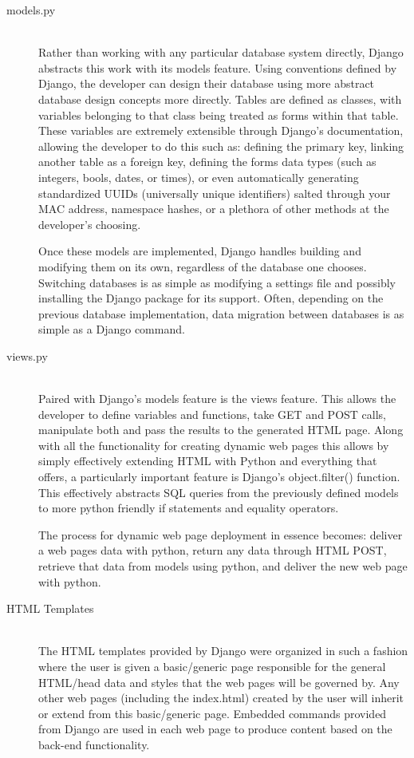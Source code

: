 \documentclass[sigconf]{acmart}
\begin{document}
\hspace{1em}\begin{description}
	\item[models.py] \hfill \\
	Rather than working with any particular database system directly, Django abstracts this work with its models feature. Using conventions defined by Django, the developer can design their database using more abstract database design concepts more directly. Tables are defined as classes, with variables belonging to that class being treated as forms within that table. These variables are extremely extensible through Django's documentation, allowing the developer to do this such as: defining the primary key, linking another table as a foreign key, defining the forms data types (such as integers, bools, dates, or times), or even automatically generating standardized UUIDs (universally unique identifiers) salted through your MAC address, namespace hashes, or a plethora of other methods at the developer's choosing. \par
	Once these models are implemented, Django handles building and modifying them on its own, regardless of the database one chooses. Switching databases is as simple as modifying a settings file and possibly installing the Django package for its support. Often, depending on the previous database implementation, data migration between databases is as simple as a Django command.
	\item[views.py] \hfill \\
	Paired with Django's models feature is the views feature. This allows the developer to define variables and functions, take GET and POST calls, manipulate both and pass the results to the generated HTML page. Along with all the functionality for creating dynamic web pages this allows by simply effectively extending HTML with Python and everything that offers, a particularly important feature is Django's object.filter() function. This effectively abstracts SQL queries from the previously defined models to more python friendly if statements and equality operators. \par
	The process for dynamic web page deployment in essence becomes: deliver a web pages data with python, return any data through HTML POST, retrieve that data from models using python, and deliver the new web page with python.
	\item[HTML Templates] \hfill \\
	The HTML templates provided by Django were organized in such a fashion where the user is given a basic/generic
	page responsible for the general HTML/head data and styles that the web pages will be governed by. Any other web pages (including the index.html) created by the user will inherit or extend from this basic/generic page. Embedded commands provided from Django are used in each web page to produce content based on the back-end functionality.
\end{description}
\end{document}
